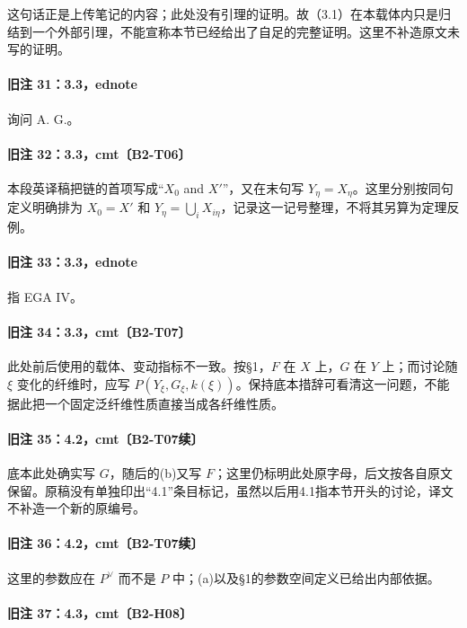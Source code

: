 \documentclass[UTF8,a4paper]{ctexbook}
\begin{document}
这句话正是上传笔记的内容；此处没有引理的证明。故（3.1）在本载体内只是归结到一个外部引理，不能宣称本节已经给出了自足的完整证明。这里不补造原文未写的证明。

\paragraph{旧注 31：3.3，ednote}

询问 A. G.。

\paragraph{旧注 32：3.3，cmt〔B2-T06〕}

本段英译稿把链的首项写成“$X_0$ and $X'$”，又在末句写 $Y_\eta=X_\eta$。这里分别按同句定义明确排为 $X_0=X'$ 和 $Y_\eta=\bigcup_iX_{i\eta}$，记录这一记号整理，不将其另算为定理反例。

\paragraph{旧注 33：3.3，ednote}

指 EGA IV。

\paragraph{旧注 34：3.3，cmt〔B2-T07〕}

此处前后使用的载体、变动指标不一致。按§1，$F$ 在 $X$ 上，$G$ 在 $Y$ 上；而讨论随 $\xi$ 变化的纤维时，应写 $P(Y_\xi,G_\xi,k(\xi))$。保持底本措辞可看清这一问题，不能据此把一个固定泛纤维性质直接当成各纤维性质。

\paragraph{旧注 35：4.2，cmt〔B2-T07续〕}

底本此处确实写 $G$，随后的(b)又写 $F$；这里仍标明此处原字母，后文按各自原文保留。原稿没有单独印出“4.1”条目标记，虽然以后用4.1指本节开头的讨论，译文不补造一个新的原编号。

\paragraph{旧注 36：4.2，cmt〔B2-T07续〕}

这里的参数应在 $P^\vee$ 而不是 $P$ 中；(a)以及§1的参数空间定义已给出内部依据。

\paragraph{旧注 37：4.3，cmt〔B2-H08〕}
\end{document}
